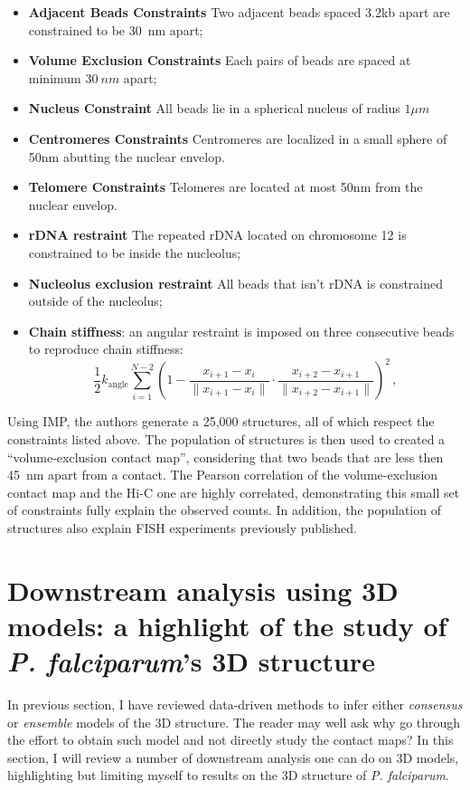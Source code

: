 \documentclass[letterpaper,12pt]{article}
\begin{document}
\begin{itemize}
\item \textbf{Adjacent Beads Constraints} Two adjacent beads spaced 3.2kb
apart are constrained to be 30~nm apart;
\item \textbf{Volume Exclusion Constraints} Each pairs of beads are spaced at
minimum $30~nm$ apart;
\item \textbf{Nucleus Constraint} All beads lie in a spherical nucleus of
radius $1\mu m$
\item \textbf{Centromeres Constraints} Centromeres are localized in a small sphere of
50nm abutting the nuclear envelop.
\item \textbf{Telomere Constraints} Telomeres are located at most 50nm from the nuclear envelop.
\item \textbf{rDNA restraint} The repeated rDNA located on chromosome 12 is
constrained to be inside the nucleolus;
\item \textbf{Nucleolus exclusion restraint} All beads that isn't rDNA is
constrained outside of the nucleolus;
\item \textbf{Chain stiffness}: an angular restraint is imposed on three
consecutive beads to reproduce chain stiffness:
\begin{equation}
\frac{1}{2} k_{\text{angle}} \sum^{N - 2}_{i = 1} \left( 1 - \frac{x_{i + 1} -
x_i}{\|x_{i + 1} - x_i\|} \cdot \frac{x_{i + 2} - x_{i + 1}}{\|x_{i + 2} -
  x_{i + 1}\|} \right)^2\,,
\end{equation}
\end{itemize}

Using IMP, the authors generate a 25,000 structures, all of which respect the
constraints listed above. The population of structures is then used to created
a ``volume-exclusion contact map'', considering that two beads that are less
then 45~nm apart from a contact. The Pearson correlation of the
volume-exclusion contact map and the Hi-C one are highly correlated,
demonstrating this small set of constraints fully explain the observed counts.
In addition, the population of structures also explain FISH experiments
previously published.


\section*{Downstream analysis using 3D models: a highlight of the study of
{\em P. falciparum}'s 3D structure}

In previous section, I have reviewed data-driven methods to infer either
\textit{consensus} or \textit{ensemble} models of the 3D structure. The reader
may well ask why go through the effort to obtain such model and not directly
study the contact maps?  In this section, I will review a number of downstream
analysis one can do on 3D models, highlighting but limiting myself to results
on the 3D structure of {\em P. falciparum}.
\end{document}
